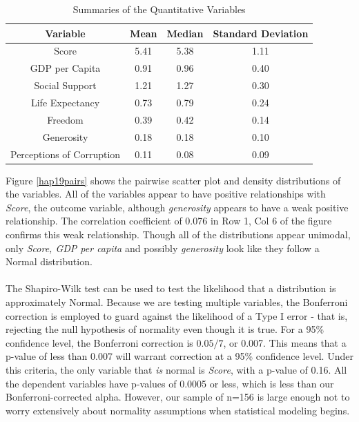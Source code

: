 \documentclass{article}
\begin{document}
\begin{table}[H]
    \centering
    \begin{tabular}{c|ccc}
         Variable&Mean&Median&Standard Deviation  \\\hline
         Score&5.41&5.38&1.11\\
         GDP per Capita&0.91&0.96&0.40\\
         Social Support&1.21&1.27&0.30\\
         Life Expectancy&0.73&0.79&0.24\\
         Freedom&0.39&0.42&0.14\\
         Generosity&0.18&0.18&0.10\\
         Perceptions of Corruption&0.11&0.08&0.09
    \end{tabular}
    \caption{Summaries of the Quantitative Variables}
    \label{means}
\end{table}

Figure \ref{hap19pairs} shows the pairwise scatter plot and density distributions of the variables. All of the variables appear to have positive relationships with \textit{Score}, the outcome variable, although \textit{generosity} appears to have a weak positive relationship. The correlation coefficient of 0.076 in Row 1, Col 6 of the figure confirms this weak relationship. Though all of the distributions appear unimodal, only \textit{Score, GDP per capita} and possibly \textit{generosity} look like they follow a Normal distribution.\\\\
The Shapiro-Wilk test can be used to test the likelihood that a distribution is approximately Normal. Because we are testing multiple variables, the Bonferroni correction is employed to guard against the likelihood of a Type I error - that is, rejecting the null hypothesis of normality even though it is true. For a 95\% confidence level, the Bonferroni correction is $0.05/7$, or 0.007. This means that a p-value of less than 0.007 will warrant correction at a 95\% confidence level. Under this criteria, the only variable that \textit{is} normal is \textit{Score}, with a p-value of 0.16. All the dependent variables have p-values of 0.0005 or less, which is less than our Bonferroni-corrected alpha. However, our sample of n=156 is large enough not to worry extensively about normality assumptions when statistical modeling begins.
\end{document}
